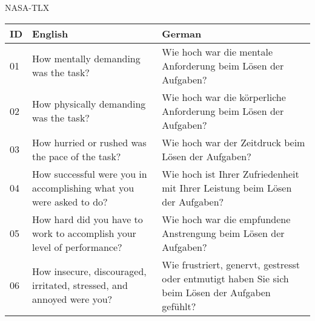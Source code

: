 \ac{NASA}-\ac{TLX}

\begin{ctable}
    \begin{tabularx}{\textwidth}{l|X|X}
        \textbf{ID} & \textbf{English} & \textbf{German} \\
        \hline
        01 & How mentally demanding was the task? & Wie hoch war die mentale Anforderung beim Lösen der Aufgaben? \\
        02 & How physically demanding was the task? & Wie hoch war die körperliche Anforderung beim Lösen der Aufgaben? \\
        03 & How hurried or rushed was the pace of the task? & Wie hoch war der Zeitdruck beim Lösen der Aufgaben? \\
        04 & How successful were you in accomplishing what you were asked to do? & Wie hoch ist Ihrer Zufriedenheit mit Ihrer Leistung beim Lösen der Aufgaben? \\
        05 & How hard did you have to work to accomplish your level of performance? & Wie hoch war die empfundene Anstrengung beim Lösen der Aufgaben? \\
        06 & How insecure, discouraged, irritated, stressed, and annoyed were you? & Wie frustriert, genervt, gestresst oder entmutigt haben Sie sich beim Lösen der Aufgaben gefühlt? \\
    \end{tabularx}
\end{ctable}

